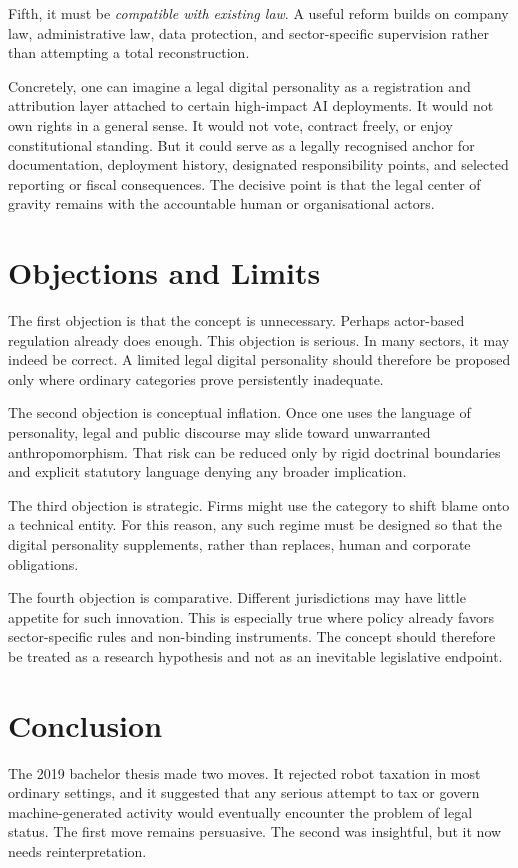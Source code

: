 \documentclass[11pt]{article}
\begin{document}
Fifth, it must be \emph{compatible with existing law}. A useful reform builds on company law, administrative law, data protection, and sector-specific supervision rather than attempting a total reconstruction.

Concretely, one can imagine a legal digital personality as a registration and attribution layer attached to certain high-impact AI deployments. It would not own rights in a general sense. It would not vote, contract freely, or enjoy constitutional standing. But it could serve as a legally recognised anchor for documentation, deployment history, designated responsibility points, and selected reporting or fiscal consequences. The decisive point is that the legal center of gravity remains with the accountable human or organisational actors.

\section{Objections and Limits}
The first objection is that the concept is unnecessary. Perhaps actor-based regulation already does enough. This objection is serious. In many sectors, it may indeed be correct. A limited legal digital personality should therefore be proposed only where ordinary categories prove persistently inadequate.

The second objection is conceptual inflation. Once one uses the language of personality, legal and public discourse may slide toward unwarranted anthropomorphism. That risk can be reduced only by rigid doctrinal boundaries and explicit statutory language denying any broader implication.

The third objection is strategic. Firms might use the category to shift blame onto a technical entity. For this reason, any such regime must be designed so that the digital personality supplements, rather than replaces, human and corporate obligations.

The fourth objection is comparative. Different jurisdictions may have little appetite for such innovation. This is especially true where policy already favors sector-specific rules and non-binding instruments. The concept should therefore be treated as a research hypothesis and not as an inevitable legislative endpoint.

\section{Conclusion}
The 2019 bachelor thesis made two moves. It rejected robot taxation in most ordinary settings, and it suggested that any serious attempt to tax or govern machine-generated activity would eventually encounter the problem of legal status. The first move remains persuasive. The second was insightful, but it now needs reinterpretation.
\end{document}
